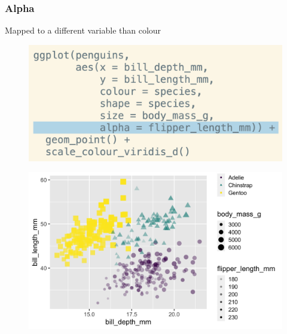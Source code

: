 \documentclass[11pt]{beamer}
\begin{document}
\begin{frame}
	\frametitle{\textbf{Alpha}}
	Mapped to a different variable than colour
	
	\begin{minipage}[t]{0.5\linewidth}
		\begin{figure}
			\centering
			\includegraphics[width=1\linewidth]{Images/S2/code/s21}
			
		\end{figure}
	\end{minipage}%
	\begin{minipage}[t]{0.5\linewidth}
		
		\begin{figure}
			\centering
			\includegraphics[width=1\linewidth]{Images/S2/alpha-1}
			
		\end{figure}
		
		
	\end{minipage}
	
	
\end{frame}


\end{document}
